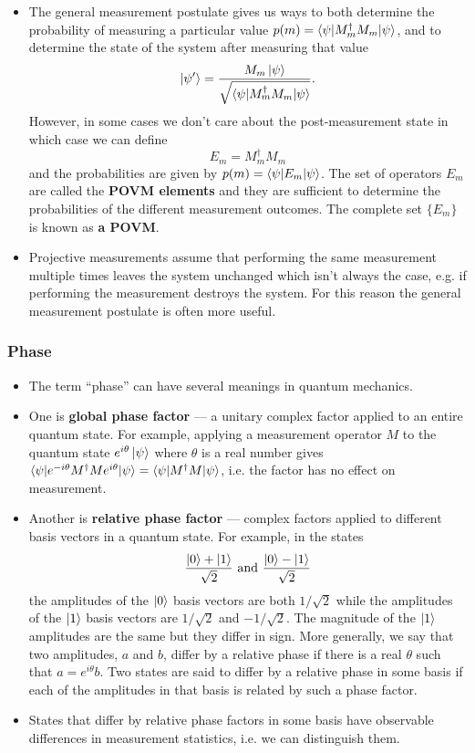 \documentclass{article}
\begin{document}
\begin{itemize}
  \item The general measurement postulate gives us ways to both determine the probability of measuring a particular value $p(m) = \braket{\psi | M_m^\dagger M_m | \psi}$, and to determine the state of the system after measuring that value \[\ket{\psi'} = \frac{M_m \ket{\psi}}{\sqrt{\braket{\psi | M_m^\dagger M_m | \psi}}}.\] However, in some cases we don't care about the post-measurement state in which case we can define \[E_m = M_m^\dagger M_m\] and the probabilities are given by $p(m) = \braket{\psi | E_m | \psi}$. The set of operators $E_m$ are called the \textbf{POVM elements} and they are sufficient to determine the probabilities of the different measurement outcomes. The complete set $\{E_m\}$ is known as \textbf{a POVM}.

  \item Projective measurements assume that performing the same measurement multiple times leaves the system unchanged which isn't always the case, e.g. if performing the measurement destroys the system. For this reason the general measurement postulate is often more useful.
\end{itemize}

\subsubsection{Phase}

\begin{itemize}
  \item The term ``phase'' can have several meanings in quantum mechanics.

  \item One is \textbf{global phase factor} — a unitary complex factor applied to an entire quantum state. For example, applying a measurement operator $M$ to the quantum state $e^{i \theta} \ket{\psi}$ where $\theta$ is a real number gives $\braket{\psi | e^{-i \theta} M^\dagger M e^{i \theta} | \psi} = \braket{\psi | M^\dagger M | \psi}$, i.e. the factor has no effect on measurement.

  \item Another is \textbf{relative phase factor} — complex factors applied to different basis vectors in a quantum state. For example, in the states \[\frac{\ket{0} + \ket{1}}{\sqrt{2}} \text{ and } \frac{\ket{0} - \ket{1}}{\sqrt{2}}\] the amplitudes of the $\ket{0}$ basis vectors are both $1 / \sqrt{2}$ while the amplitudes of the $\ket{1}$ basis vectors are $1 / \sqrt{2}$ and $-1 / \sqrt{2}$. The magnitude of the $\ket{1}$ amplitudes are the same but they differ in sign. More generally, we say that two amplitudes, $a$ and $b$, differ by a relative phase if there is a real $\theta$ such that $a = e^{i \theta} b$. Two states are said to differ by a relative phase in some basis if each of the amplitudes in that basis is related by such a phase factor.

  \item States that differ by relative phase factors in some basis have observable differences in measurement statistics, i.e. we can distinguish them.
\end{itemize}
\end{document}

